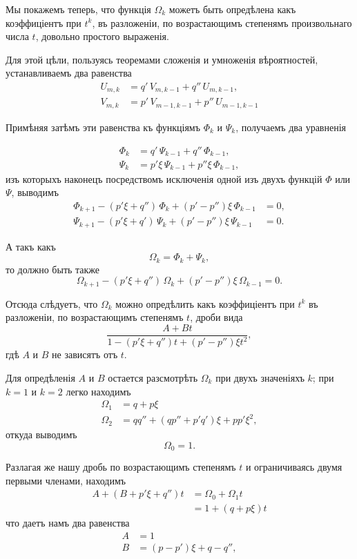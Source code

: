 \documentclass[12pt]{article}
\begin{document}
Мы покажемъ теперь, что функція $\Omega_k$ можетъ быть опредѣлена какъ коэффиціентъ при $t^k$, въ разложеніи, по возрастающимъ степенямъ произвольнаго числа $t$, довольно простого выраженія.

Для этой цѣли, пользуясь теоремами сложенія и умноженія вѣроятностей, устанавливаемъ два равенства
\begin{align*}
U_{m,k} &= q'\,V_{m,k-1} + q''\,U_{m,k-1}, \\
V_{m,k} &= p'\,V_{m-1,k-1} + p''\,U_{m-1,k-1}
\end{align*}

Примѣняя затѣмъ эти равенства къ функціямъ $\Phi_k$ и $\Psi_k$, получаемъ два уравненія


\begin{align*}
\Phi_k &= q'\,\Psi_{k-1} + q''\,\Phi_{k-1}, \\
\Psi_k &= p'\xi\,\Psi_{k-1} + p''\xi\,\Phi_{k-1},
\end{align*}
изъ которыхъ наконецъ посредствомъ исключенія одной изъ двухъ функцій $\Phi$ или $\Psi$, выводимъ
\begin{align*}
\Phi_{k+1} - (p'\xi + q'')\,\Phi_k + (p' - p'')\xi\,\Phi_{k-1} &= 0, \\
\Psi_{k+1} - (p'\xi + q')\,\Psi_k + (p' - p'')\xi\,\Psi_{k-1} &= 0.
\end{align*}

А такъ какъ
\[
\Omega_k = \Phi_k + \Psi_k,
\]
то должно быть также
\[
\Omega_{k+1} - (p'\xi + q'')\,\Omega_k + (p' - p'')\xi\,\Omega_{k-1} = 0.
\]

Отсюда слѣдуетъ, что $\Omega_k$ можно опредѣлить какъ коэффиціентъ при $t^k$ въ разложеніи, по возрастающимъ степенямъ $t$, дроби вида
\[
\frac{A + Bt}{1 - (p'\xi + q'')t + (p' - p'')\xi t^2},
\]
гдѣ $A$ и $B$ не зависятъ отъ $t$.

Для опредѣленія $A$ и $B$ остается разсмотрѣть $\Omega_k$ при двухъ значеніяхъ $k$; при $k = 1$ и $k = 2$ легко находимъ
\begin{align*}
\Omega_1 &= q + p\xi \\
\Omega_2 &= qq'' + (qp'' + p'q')\xi + pp'\xi^2,
\end{align*}
откуда выводимъ
\[
\Omega_0 = 1.
\]

Разлагая же нашу дробь по возрастающимъ степенямъ $t$ и ограничиваясь двумя первыми членами, находимъ
\begin{align*}
A + (B + p'\xi + q'')t &= \Omega_0 + \Omega_1 t \\
&= 1 + (q + p\xi)t
\end{align*}
что даетъ намъ два равенства
\begin{align*}
A &= 1 \\
B &= (p - p')\xi + q - q'',
\end{align*}
\end{document}
